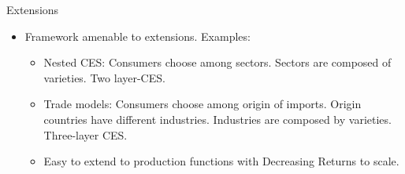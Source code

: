 \documentclass[11pt,aspectratio=169,xcolor={dvipsnames},hyperref={pdftex,pdfpagemode=UseNone,hidelinks,pdfdisplaydoctitle=true},usepdftitle=false]{beamer}
\begin{document}
\begin{frame}{Extensions}
\begin{itemize}
\item Framework amenable to extensions. Examples:
\begin{itemize}
\item Nested CES: Consumers choose among sectors. Sectors are composed of varieties. Two layer-CES.
\item Trade models: Consumers choose among origin of imports. Origin countries have different industries. Industries are composed by varieties. Three-layer CES.
\item Easy to extend to production functions with Decreasing Returns to scale.
\end{itemize}
\end{itemize}
\end{frame}
\end{document}
